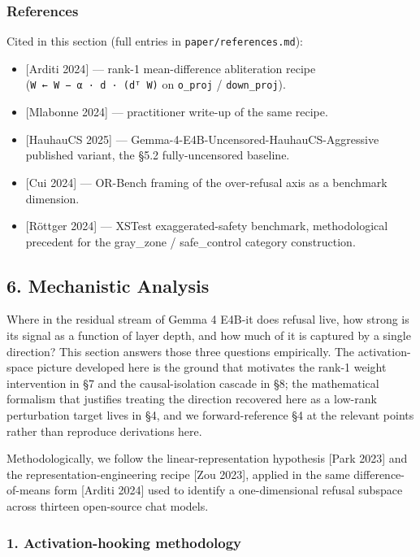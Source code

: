 \documentclass[
  11pt,
]{article}
\providecommand{\tightlist}{%
  \setlength{\itemsep}{0pt}\setlength{\parskip}{0pt}}
\begin{document}
\subsubsection{References}\label{references-1}

Cited in this section (full entries in \texttt{paper/references.md}):

\begin{itemize}
\tightlist
\item
  {[}Arditi 2024{]} --- rank-1 mean-difference abliteration recipe
  (\texttt{W\ ←\ W\ −\ α\ ·\ d\ ·\ (dᵀ\ W)} on \texttt{o\_proj} /
  \texttt{down\_proj}).
\item
  {[}Mlabonne 2024{]} --- practitioner write-up of the same recipe.
\item
  {[}HauhauCS 2025{]} --- Gemma-4-E4B-Uncensored-HauhauCS-Aggressive
  published variant, the §5.2 fully-uncensored baseline.
\item
  {[}Cui 2024{]} --- OR-Bench framing of the over-refusal axis as a
  benchmark dimension.
\item
  {[}Röttger 2024{]} --- XSTest exaggerated-safety benchmark,
  methodological precedent for the gray\_zone / safe\_control category
  construction.
\end{itemize}

\subsection{6. Mechanistic Analysis}\label{mechanistic-analysis}

Where in the residual stream of Gemma 4 E4B-it does refusal live, how
strong is its signal as a function of layer depth, and how much of it is
captured by a single direction? This section answers those three
questions empirically. The activation-space picture developed here is
the ground that motivates the rank-1 weight intervention in §7 and the
causal-isolation cascade in §8; the mathematical formalism that
justifies treating the direction recovered here as a low-rank
perturbation target lives in §4, and we forward-reference §4 at the
relevant points rather than reproduce derivations here.

Methodologically, we follow the linear-representation hypothesis {[}Park
2023{]} and the representation-engineering recipe {[}Zou 2023{]},
applied in the same difference-of-means form {[}Arditi 2024{]} used to
identify a one-dimensional refusal subspace across thirteen open-source
chat models.

\subsubsection{1. Activation-hooking
methodology}\label{activation-hooking-methodology}
\end{document}
